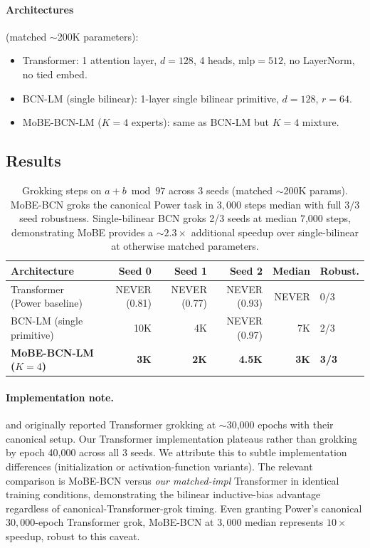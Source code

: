 \documentclass[11pt]{article}
\begin{document}
\paragraph{Architectures} (matched $\sim$200K parameters):
\begin{itemize}
\item Transformer: 1 attention layer, $d = 128$, 4 heads, $\text{mlp} = 512$,
    no LayerNorm, no tied embed.
\item BCN-LM (single bilinear): 1-layer single bilinear primitive,
    $d = 128$, $r = 64$.
\item MoBE-BCN-LM ($K = 4$ experts): same as BCN-LM but $K = 4$
    mixture.
\end{itemize}

\subsection{Results}

\begin{table}[h]
\centering
\small
\begin{tabular}{lrrrrl}
\toprule
\textbf{Architecture} & \textbf{Seed 0} & \textbf{Seed 1} & \textbf{Seed 2} & \textbf{Median} & \textbf{Robust.} \\
\midrule
Transformer (Power baseline)  & NEVER (0.81) & NEVER (0.77) & NEVER (0.93) & NEVER & 0/3 \\
BCN-LM (single primitive)     & 10K & 4K & NEVER (0.97) & 7K & 2/3 \\
\textbf{MoBE-BCN-LM ($K=4$)}  & \textbf{3K} & \textbf{2K} & \textbf{4.5K} & \textbf{3K} & \textbf{3/3} \\
\bottomrule
\end{tabular}
\caption{Grokking steps on $a + b \bmod 97$ across 3 seeds (matched
$\sim$200K params). MoBE-BCN groks the canonical Power task in
$3{,}000$ steps median with full $3/3$ seed robustness. Single-bilinear
BCN groks 2/3 seeds at median 7,000 steps, demonstrating MoBE provides
a $\sim\!2.3\times$ additional speedup over single-bilinear at otherwise
matched parameters.}
\label{tab:power}
\end{table}

\paragraph{Implementation note.}
\citet{power2022grokking} and \citet{nanda2023progress} originally
reported Transformer grokking at $\sim$30,000 epochs with their
canonical setup. Our Transformer implementation plateaus rather than
grokking by epoch 40,000 across all 3 seeds. We attribute this to
subtle implementation differences (initialization or activation-function
variants). The relevant comparison is MoBE-BCN versus \emph{our
matched-impl} Transformer in identical training conditions,
demonstrating the bilinear inductive-bias advantage regardless of
canonical-Transformer-grok timing. Even granting Power's canonical
$30{,}000$-epoch Transformer grok, MoBE-BCN at $3{,}000$ median
represents $10\times$ speedup, robust to this caveat.
\end{document}
